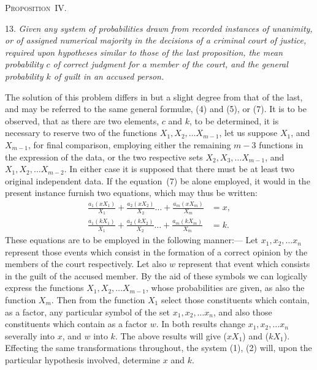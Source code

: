 \documentclass[oneside]{book}
\begin{document}
\begin{center}\textsc{Proposition~IV.}\end{center}

13. \emph{Given any system of probabilities drawn from recorded instances of unanimity, or of assigned numerical majority in the decisions of a criminal court of justice, required upon hypotheses
similar to those of the last proposition, the mean probability $c$ of
}%
\emph{correct judgment for a member of the court, and the general probability $k$ of guilt in an accused person.}

The solution of this problem differs in but a slight degree
from that of the last, and may be referred to the same general
formul{\ae}, (4) and (5), or (7). It is to be observed, that as there
are two elements, $c$ and $k$, to be determined, it is necessary to
reserve two of the functions $X_1, X_2,\dotsc X_{m-1}$, let us suppose $X_1$,
and $X_{m-1}$, for final comparison, employing either the remaining
$m-3$ functions in the expression of the data, or the two respective sets $X_2, X_3,\dotsc X_{m-1}$, and $X_1, X_2,\dotsc X_{m-2}$. In either case
it is supposed that there must be at least two original independent data. If the equation~(7) be alone employed, it would in
the present instance furnish two equations, which may thus be
written:
\begin{align*}
  \frac{a_1(xX_1)}{X_1}
+ \frac{a_2(xX_2)}{X_2} \dotsc
+ \frac{a_m(xX_m)}{X_m} &= x,     \tag{1}
\\
  \frac{a_1(kX_1)}{X_1}
+ \frac{a_2(kX_2)}{X_2} \dotsc
+ \frac{a_m(kX_m)}{X_m} &= k.     \tag{2}
\end{align*}
These equations are to be employed in the following manner:---
Let $x_1, x_2, \dotsc x_n$ represent those events which consist in the formation of a correct opinion by the members of the court respectively. Let also $w$ represent that event which consists in the
guilt of the accused member. By the aid of these symbols we
can logically express the functions $X_1, X_2,\dotsc X_{m-1}$, whose probabilities are given, as also the function $X_m$. Then from the function $X_1$ select those constituents which contain, as a factor, any
particular symbol of the set $x_1, x_2, \dotsc x_n$, and also those constituents which contain as a factor $w$. In both results change
$x_1, x_2, \dotsc x_n$ severally into $x$, and $w$ into $k$. The above results
will give ($xX_1$) and ($kX_1$). Effecting the same transformations
throughout, the system (1), (2) will, upon the particular hypothesis involved, determine $x$ and $k$.
\end{document}
